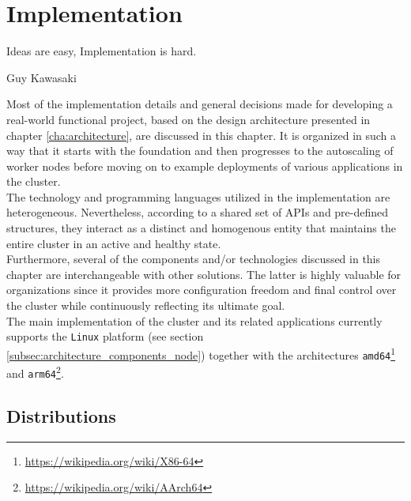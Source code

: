 \chapter{Implementation}
\label{cha:implementation}

\epigraph{Ideas are easy, Implementation is hard.}{Guy Kawasaki}

Most of the implementation details and general decisions made for developing a
real-world functional project, based on the design architecture presented in chapter
\ref{cha:architecture}, are discussed in this chapter. It is organized in such a
way that it starts with the foundation and then progresses to the autoscaling of
worker nodes before moving on to example deployments of various applications in the
cluster. \\ %
The technology and programming languages utilized in the implementation are heterogeneous.
Nevertheless, according to a shared set of APIs and pre-defined structures, they
interact as a distinct and homogenous entity that maintains the entire cluster
in an active and healthy state. \\ %
Furthermore, several of the components and/or technologies discussed in this chapter
are interchangeable with other solutions. The latter is highly valuable for
organizations since it provides more configuration freedom and final control
over the cluster while continuously reflecting its ultimate goal. \\ %
The main implementation of the cluster and its related applications currently
supports the \texttt{Linux} platform (see section
\ref{subsec:architecture_components_node}) together with the architectures \texttt{amd64}\footnote{\url{https://wikipedia.org/wiki/X86-64}}
and \texttt{arm64}\footnote{\url{https://wikipedia.org/wiki/AArch64}}.

\section{Distributions}
\label{sec:implementation_distributions}

